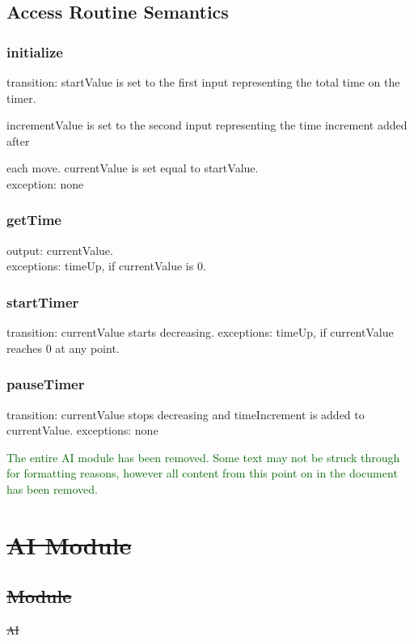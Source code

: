 \documentclass[12pt, titlepage]{article}
\begin{document}
    \subsection*{Access Routine Semantics}
        \subsubsection*{initialize} 
            transition: startValue is set to the first input representing the total time on the timer. 
            
            incrementValue is set to the second input representing the time increment added after 
            
            each move. currentValue is set equal to startValue.\\
            exception: none
            
        \subsubsection*{getTime}
            output: currentValue. \\
            exceptions: timeUp, if currentValue is 0.
        
        \subsubsection*{startTimer}
            transition: currentValue starts decreasing.
            exceptions: timeUp, if currentValue reaches 0 at any point.
        
        \subsubsection*{pauseTimer}
            transition: currentValue stops decreasing and timeIncrement is added to currentValue.
            exceptions: none            




\newpage
\textcolor{darkgreen}{The entire AI module has been removed. Some text may not be struck through for formatting reasons, however all content from this point on in the document has been removed.}
\section*{\sout{AI Module}}
    \subsection*{\sout{Module}}
        \sout{AI}
    
\end{document}
